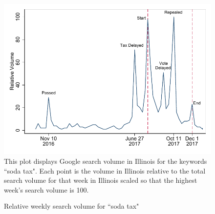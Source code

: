 \documentclass[12pt]{article}
\begin{document}
\clearpage
\begin{figure}[t]\centering
\caption{Relative weekly search volume for ``soda tax"}
\label{gtrends}
	\includegraphics[width = \textwidth]{../figures/gtrends.pdf}
	\footnotesize This plot displays Google search volume in Illinois for the keywords ``soda tax". Each point is the volume in Illinois relative to the total search volume for that week in Illinois scaled so that the highest week's search volume is 100.
\end{figure}
\end{document}
